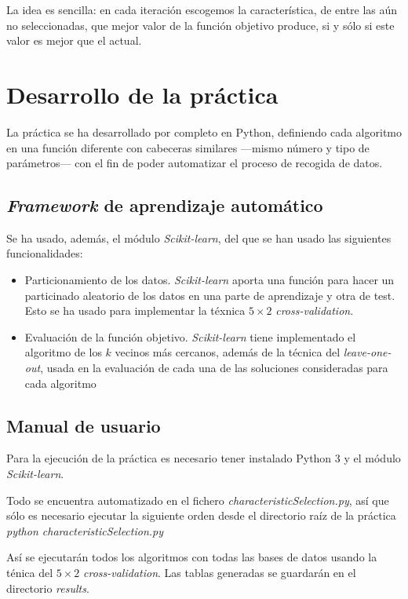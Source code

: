 \documentclass[a4paper, 11pt, titlepage]{article}
\begin{document}
    La idea es sencilla: en cada iteración escogemos la característica, de entre las aún no seleccionadas, que mejor valor de la función objetivo produce, si y sólo si este valor es mejor que el actual.

    \section{Desarrollo de la práctica}

    La práctica se ha desarrollado por completo en Python, definiendo cada algoritmo en una función diferente con cabeceras similares ---mismo número y tipo de parámetros--- con el fin de poder automatizar el proceso de recogida de datos.

    \subsection{\emph{Framework} de aprendizaje automático}
    Se ha usado, además, el módulo \emph{Scikit-learn}, del que se han usado las siguientes funcionalidades:
    \begin{itemize}
        \item Particionamiento de los datos. \emph{Scikit-learn} aporta una función para hacer un particinado aleatorio de los datos en una parte de aprendizaje y otra de test. Esto se ha usado para implementar la téxnica $5\times2$ \emph{cross-validation}.
        \item Evaluación de la función objetivo. \emph{Scikit-learn} tiene implementado el algoritmo de los $k$ vecinos más cercanos, además de la técnica del \emph{leave-one-out}, usada en la evaluación de cada una de las soluciones consideradas para cada algoritmo
    \end{itemize}

    \subsection{Manual de usuario}
    Para la ejecución de la práctica es necesario tener instalado Python 3 y el módulo \emph{Scikit-learn}.

    Todo se encuentra automatizado en el fichero \emph{characteristicSelection.py}, así que sólo es necesario ejecutar la siguiente orden desde el directorio raíz de la práctica \emph{python characteristicSelection.py}

    Así se ejecutarán todos los algoritmos con todas las bases de datos usando la ténica del  $5\times2$ \emph{cross-validation}. Las tablas generadas se guardarán en el directorio \emph{results}.
\end{document}
